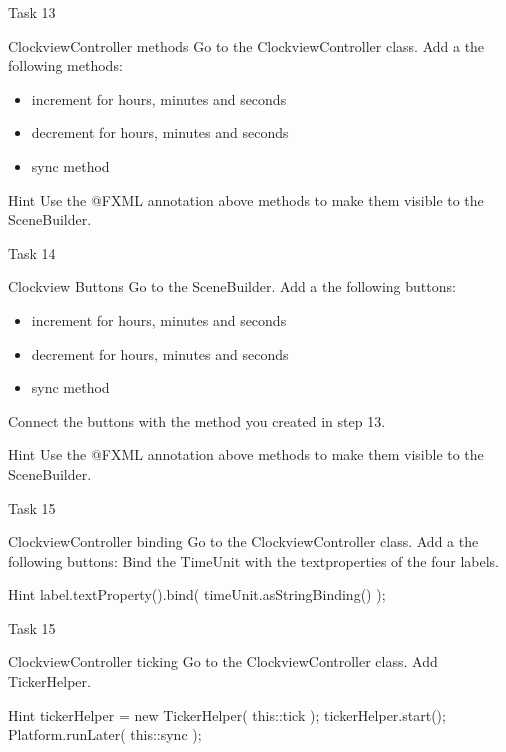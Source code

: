 \begin{frame}{Task 13}
\begin{block}{ClockviewController methods}
Go to the ClockviewController class. Add a the following methods:
\begin{itemize}
\item increment for hours, minutes and seconds
\item decrement for hours, minutes and seconds
\item sync method
\end{itemize}
\end{block}
\pause
\begin{exampleblock}{Hint}
Use the @FXML annotation above methods to make them visible to the SceneBuilder.
\end{exampleblock}
\end{frame}
\begin{frame}{Task 14}
\begin{block}{Clockview Buttons}
Go to the SceneBuilder. Add a the following buttons:
\begin{itemize}
\item increment for hours, minutes and seconds
\item decrement for hours, minutes and seconds
\item sync method
\end{itemize}
Connect the buttons with the method you created in step 13.
\end{block}
\pause
\begin{exampleblock}{Hint}
Use the @FXML annotation above methods to make them visible to the SceneBuilder.
\end{exampleblock}
\end{frame}
\begin{frame}{Task 15}
\begin{block}{ClockviewController binding}
Go to the ClockviewController class. Add a the following buttons:
Bind the TimeUnit with the textproperties of the four labels.
\end{block}
\pause
\begin{exampleblock}{Hint}
 label.textProperty().bind( timeUnit.asStringBinding() );
\end{exampleblock}
\end{frame}
\begin{frame}{Task 15}
\begin{block}{ClockviewController ticking}
Go to the ClockviewController class. Add TickerHelper.
\end{block}
\pause
\begin{exampleblock}{Hint}
 tickerHelper = new TickerHelper( this::tick );
        tickerHelper.start();
        Platform.runLater( this::sync );
\end{exampleblock}
\end{frame}
